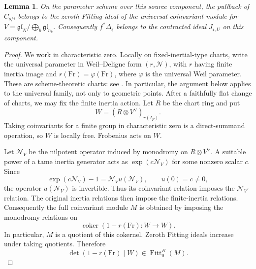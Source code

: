 \documentclass[11pt,a4paper]{amsart}
\DeclareMathOperator{\Fitt}{Fitt}
\newtheorem{lemma}[theorem]{Lemma}
\theoremstyle{definition}
\theoremstyle{remark}
\newcommand{\grs}{\mathfrak s}
\newcommand{\grt}{\mathfrak t}
\begin{document}
\begin{lemma}\label{lem:cross-fitting}
On the parameter scheme over this source component, the pullback of
$C_{\grs/\grt}$ belongs to the zeroth Fitting ideal of the universal
coinvariant module for
$V=\mathfrak{gl}_N/\bigoplus_b\mathfrak{gl}_{n_b}$.
Consequently $f^*\Delta_{\grs}$ belongs to the contracted ideal
$J_{\mathfrak e,U}$ on this component.
\end{lemma}
\begin{proof}
We work in characteristic zero. Locally on fixed-inertial-type
charts, write the universal parameter in Weil--Deligne form
$(r,\mathcal N)$, with $r$ having finite inertia image and
$r(\mathrm{Fr})=\varphi(\mathrm{Fr})$, where $\varphi$ is the
universal Weil parameter. These are scheme-theoretic charts:
see \cite[Propositions 2.6--2.7, Section 3, and (4.2)--(4.5)]{DHKM}.
In particular, the argument below applies to the universal
family, not only to geometric points.
After a faithfully flat change of charts, we may fix the finite
inertia action. Let $R$ be the chart ring and put
$$
 W=(R\otimes V^\vee)_{r(I_F)}.
$$
Taking coinvariants for a finite group in characteristic zero is
a direct-summand operation, so $W$ is locally free. Frobenius
acts on $W$.

Let $\mathcal N_V$ be the nilpotent operator induced by monodromy on
$R\otimes V^\vee$. A suitable power of a tame inertia generator
acts as $\exp(c\mathcal N_V)$ for some nonzero scalar $c$. Since
$$
 \exp(c\mathcal N_V)-1=\mathcal N_Vu(\mathcal N_V),\qquad u(0)=c\ne0,
$$
the operator $u(\mathcal N_V)$ is invertible. Thus its coinvariant relation
imposes the $\mathcal N_V$-relation. The original inertia relations then
impose the finite-inertia relations. Consequently the full
coinvariant module $M$ is obtained by imposing the monodromy
relations on
$$
 \operatorname{coker}(1-r(\mathrm{Fr}):W\longrightarrow W).
$$
In particular, $M$ is a quotient of this cokernel.
Zeroth Fitting ideals increase under taking quotients. Therefore
\begin{equation}\label{eq:fitting-determinant}
 \det(1-r(\mathrm{Fr})\mid W)\in\Fitt_0^R(M).
\end{equation}


\end{proof}
\end{document}
